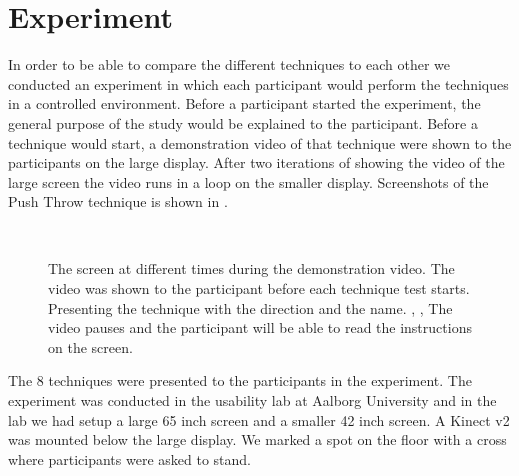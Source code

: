\section{Experiment} \label{sec:experiment}
In order to be able to compare the different techniques to each other we conducted an experiment in which each participant would perform the techniques in a controlled environment.
Before a participant started the experiment, the general purpose of the study would be explained to the participant.
Before a technique would start, a demonstration video of that technique were shown to the participants on the large display.
After two iterations of showing the video of the large screen the video runs in a loop on the smaller display.
Screenshots of the Push Throw technique is shown in .

\begin{figure}[H]
\\
\caption{The screen at different times during the demonstration video. The video was shown to the participant before each technique test starts. \protect{} Presenting the technique with the direction and the name. \protect{}, \protect{}, \protect{} The video pauses and the participant will be able to read the instructions on the screen.}
\label{fig:demovideo}
\end{figure}

The 8 techniques were presented to the participants in the experiment.
The experiment was conducted in the usability lab at Aalborg University and in the lab we had setup a large 65 inch screen and a smaller 42 inch screen. A Kinect v2 was mounted below the large display.
We marked a spot on the floor with a cross where participants were asked to stand.
